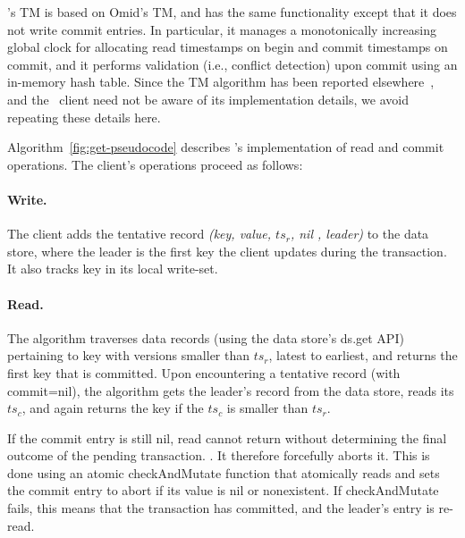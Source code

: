 \sys's TM is based on Omid's TM, and has the same functionality except that it does not write commit entries.
In particular, it manages a monotonically increasing global clock for allocating read timestamps on begin and commit timestamps on commit,
and it performs validation (i.e., conflict detection) upon commit using an in-memory hash table. 
Since the TM algorithm has been reported elsewhere~\cite{omid-fast}, and the \sys\ client need not be aware of 
its implementation details, we avoid repeating these details here. 

Algorithm~\ref{fig:get-pseudocode} describes \sys's implementation of read and commit operations.
The client's operations proceed as follows:

\paragraph{Write.}
The client adds the tentative record \emph{(key, value, $ts_r$, nil , leader)} to the data store, where
the leader is the first key the client updates during the transaction. It also tracks key in its local write-set.

\paragraph{Read.}
The algorithm traverses data  records (using the data store's ds.get API) pertaining
to key with versions smaller than $ts_r$, latest to earliest, and returns the first key that is committed. Upon
encountering a tentative record (with commit=nil), the algorithm gets the leader's record from the data store,
reads its $ts_c$, and again returns the key if the $ts_c$ is smaller than $ts_r$. 

If the commit entry is still nil, read cannot return without determining the final outcome
of the pending transaction. . 
It  therefore forcefully aborts it. This is done using an atomic 
 {checkAndMutate} function that atomically reads and sets the commit entry to abort if its value is nil or nonexistent.
 If checkAndMutate fails, this means that the transaction has committed, and the leader's entry is re-read.



